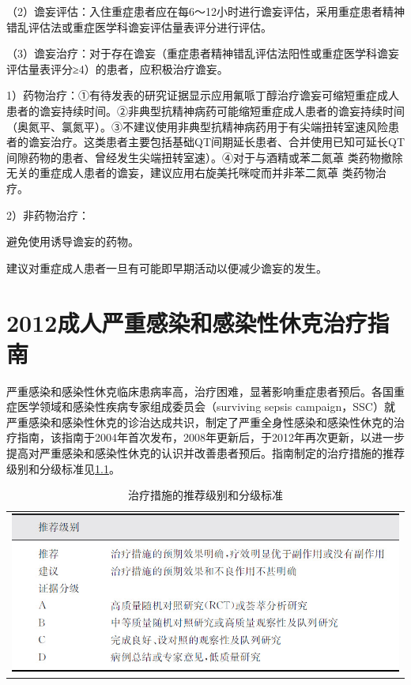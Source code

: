 （2）谵妄评估：入住重症患者应在每6～12小时进行谵妄评估，采用重症患者精神错乱评估法或重症医学科谵妄评估量表评分进行评估。

（3）谵妄治疗：对于存在谵妄（重症患者精神错乱评估法阳性或重症医学科谵妄评估量表评分≥4）的患者，应积极治疗谵妄。

1）药物治疗：①有待发表的研究证据显示应用氟哌丁醇治疗谵妄可缩短重症成人患者的谵妄持续时间。②非典型抗精神病药可能缩短重症成人患者的谵妄持续时间（奥氮平、氯氮平）。③不建议使用非典型抗精神病药用于有尖端扭转室速风险患者的谵妄治疗。这类患者主要包括基础QT间期延长患者、合并使用已知可延长QT间隙药物的患者、曾经发生尖端扭转室速）。④对于与酒精或苯二氮䓬
类药物撤除无关的重症成人患者的谵妄，建议应用右旋美托咪啶而并非苯二氮䓬
类药物治疗。

2）非药物治疗：

避免使用诱导谵妄的药物。

建议对重症成人患者一旦有可能即早期活动以便减少谵妄的发生。

\protect\hypertarget{text00037.html}{}{}

\chapter{2012成人严重感染和感染性休克治疗指南}

严重感染和感染性休克临床患病率高，治疗困难，显著影响重症患者预后。各国重症医学领域和感染性疾病专家组成委员会（surviving
sepsis
campaign，SSC）就严重感染和感染性休克的诊治达成共识，制定了严重全身性感染和感染性休克的治疗指南，该指南于2004年首次发布，2008年更新后，于2012年再次更新，以进一步提高对严重感染和感染性休克的认识并改善患者预后。指南制定的治疗措施的推荐级别和分级标准见\ref{tabapp-13}。


\begin{longtable}{c}
  \caption{治疗措施的推荐级别和分级标准}
  \label{tabapp-13}
  \endfirsthead
  \caption[]{治疗措施的推荐级别和分级标准}
  \endhead
\includegraphics[width=\textwidth,height=\textheight,keepaspectratio]{./images/Image00317.jpg}
\end{longtable}


